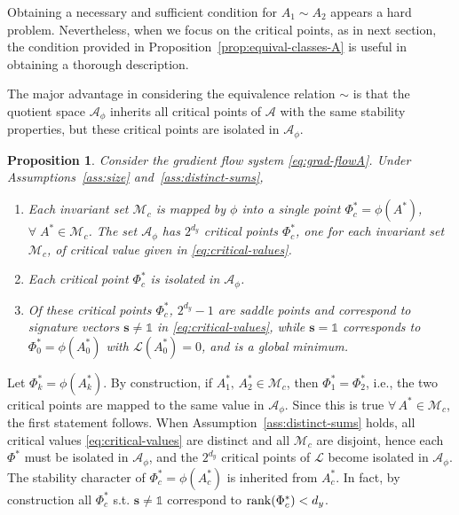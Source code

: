 \documentclass{article}
\makeatletter
\renewenvironment{proof}[1][\proofname]{
  \par\pushQED{\qed}\normalfont
  \topsep6\p@\@plus6\p@\relax
  \trivlist\item[\hskip\labelsep\bfseries#1\@addpunct{.}]
  \ignorespaces
}{
  \popQED\endtrivlist\@endpefalse
}
\newtheorem{proposition}{Proposition}
\def\rank{{\rm rank}}
\newcommand{\1}{\mathds{1}}
\newcommand{\benu}{\begin{enumerate}}
\newcommand{\eenu}{\end{enumerate}}
\makeatother
\begin{document}
Obtaining a necessary and sufficient condition for $ A_1 \sim A_2 $ appears a hard problem. Nevertheless, when we focus on the critical points, as in next section, the condition provided in Proposition~\ref{prop:equival-classes-A} is useful in obtaining a thorough description.


The major advantage in considering the equivalence relation $ \sim$ is that the quotient space $ \mathcal{A}_\phi $ inherits all critical points of $ \mathcal{A}$ with the same stability properties, but these critical points are isolated in $ \mathcal{A}_\phi$. 

\begin{proposition} 
Consider the gradient flow system \eqref{eq:grad-flowA}. 
Under Assumptions~\ref{ass:size} and~\ref{ass:distinct-sums},
\benu
\item Each invariant set $ \mathcal{M}_c $ is mapped by $ \phi $ into a single point $ \Phi_c^\ast = \phi(A^\ast)$, $ \forall \; A^\ast \in \mathcal{M}_c $. The set $ \mathcal{A}_\phi $ has $ 2^{d_y} $ critical points $ \Phi_c^\ast$, one for each invariant set $ \mathcal{M}_c $, of critical value given in \eqref{eq:critical-values}. 
\item Each critical point $ \Phi_c^\ast$ is isolated in $ \mathcal{A}_\phi $. 
\item Of these critical points $ \Phi_c^\ast$, $ 2^{d_y} - 1 $ are saddle points and correspond to signature vectors $ \mathbf{s} \neq \1$ in \eqref{eq:critical-values}, while $ \mathbf{s}=\1 $ corresponds to $ \Phi_0^\ast = \phi(A_0^\ast ) $ with $ \mathcal{L}(A_0^\ast )=0$, and is a global minimum. 

\eenu\end{proposition}

\begin{proof}
Let $ \Phi_k^\ast = \phi(A_k^\ast)$. 
By construction, if $ A_1^\ast, \, A_2^\ast \in \mathcal{M}_c $, then $ \Phi_1^\ast = \Phi_2^\ast$, i.e., the two critical points are mapped to the same value in $ \mathcal{A}_\phi$. 
Since this is true $ \forall \, A^\ast \in \mathcal{M}_c $, the first statement follows. 
When Assumption~\ref{ass:distinct-sums} holds, all critical values \eqref{eq:critical-values} are distinct and all $ \mathcal{M}_c $ are disjoint, hence each $ \Phi^\ast $ must be isolated in $ \mathcal{A}_\phi$, and the $ 2^{d_y}$ critical points of $ \mathcal{L}$ become isolated in $ \mathcal{A}_\phi$.
The stability character of $ \Phi_c^\ast = \phi(A_c^\ast) $ is inherited from $ A_c^\ast $.
In fact, by construction all $ \Phi_c^\ast $ s.t. $ \mathbf{s}\neq \1 $ correspond to $ \rank (\Phi_c^\ast) < d_y $.
\end{proof}
\end{document}
